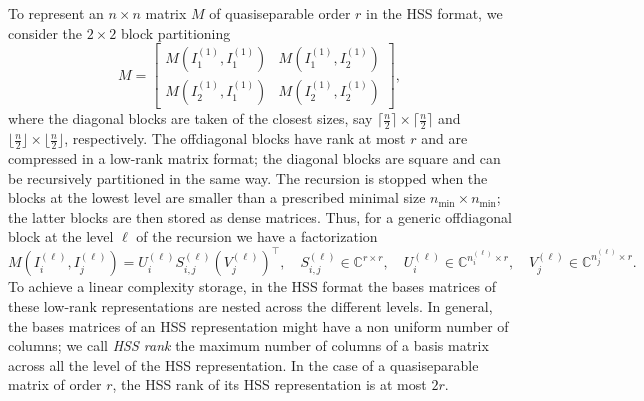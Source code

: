 \documentclass[a4paper,10pt]{article}
\begin{document}
To represent an $n\times n$ matrix $M$ of quasiseparable order $r$ in the HSS format, we consider the $2\times 2$ block partitioning
\begin{equation}\label{eq:splitting}
M=\begin{bmatrix}
	M(I_1^{(1)}, I_1^{(1)}) & M(I_1^{(1)}, I_2^{(1)})\\
	M(I_2^{(1)}, I_1^{(1)}) & M(I_2^{(1)}, I_2^{(1)})	
\end{bmatrix},
\end{equation}
 where the diagonal blocks are taken of the closest sizes, say $\lceil\frac n2\rceil\times \lceil\frac n2\rceil$ and $\lfloor\frac n2\rfloor\times \lfloor\frac n2\rfloor$, respectively. The offdiagonal blocks have rank at most $r$ and are compressed in a low-rank matrix format; the diagonal blocks are square and can 
 be recursively partitioned in the same way. The recursion is stopped when the blocks 
 at the lowest level are smaller than 
 a prescribed minimal size $n_{\min} \times n_{\min}$; the latter blocks are then stored as dense matrices. 
Thus, for a generic offdiagonal block at the level $\ell$ of the recursion we have a factorization
\[
M(I^{(\ell)}_i,I^{(\ell)}_j) = U_i^{(\ell)} S_{i,j}^{(\ell)} (V_j^{(\ell)})^\top, \quad S_{i,j}^{(\ell)} \in\mathbb C^{r\times r}, \quad U_i^{(\ell)}\in \mathbb C^{n_i^{(\ell)} \times r},\quad V_j^{(\ell)} \in \mathbb C^{n_j^{(\ell)} \times r}.
\]
To achieve a linear complexity storage, in the HSS format the bases matrices of these low-rank representations are nested across the different levels. In general, the bases matrices of an HSS representation might have a non uniform number of columns; we call \emph{HSS rank} the maximum number of columns of a basis matrix across all the level of the HSS representation. In the case of a quasiseparable matrix of order $r$, the HSS rank of its HSS representation is at most $2r$. 
\end{document}
